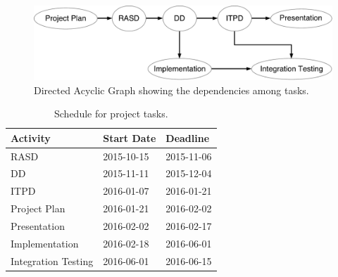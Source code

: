 \begin{figure}
    \centering
    \includegraphics[width=\textwidth]{figures/TasksDAG.pdf}
    \caption{Directed Acyclic Graph showing the dependencies among tasks.}
    \label{fig:tasks-dag}
\end{figure}

\begin{table}[p]
    \centering
    \begin{tabular}{| l | l | l |}
        \hline
        \textbf{Activity}   & \textbf{Start Date}   & \textbf{Deadline} \\
        \hline
        RASD                & 2015-10-15            & 2015-11-06        \\
        DD                  & 2015-11-11            & 2015-12-04        \\
        ITPD                & 2016-01-07            & 2016-01-21        \\
        Project Plan        & 2016-01-21            & 2016-02-02        \\
        Presentation        & 2016-02-02            & 2016-02-17        \\
        Implementation      & 2016-02-18            & 2016-06-01        \\
        Integration Testing & 2016-06-01            & 2016-06-15        \\
        \hline
    \end{tabular}
    \caption{Schedule for project tasks.}
    \label{tab:schedule}
\end{table}

